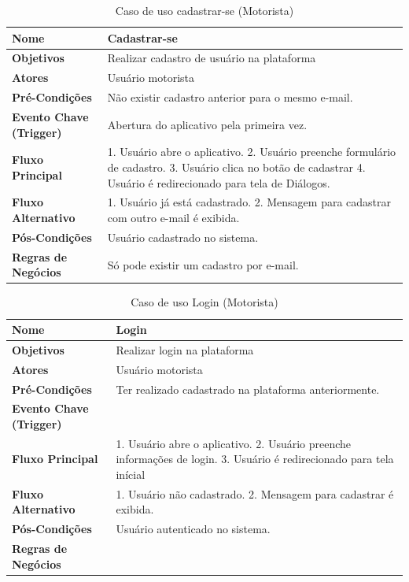 \begin{table}[H]
\begin{center}
\caption{Caso de uso cadastrar-se (Motorista)}
\label{tab:caso-uso-cadastrar}
\begin{tabular}{|p{4cm}|p{9cm}|}
\hline
\textbf{Nome} & Cadastrar-se \\
\hline
\textbf{Objetivos} & Realizar cadastro de usuário na plataforma \\
\hline
\textbf{Atores} & Usuário motorista \\
\hline
\textbf{Pré-Condições} & Não existir cadastro anterior para o mesmo e-mail. \\
\hline
\textbf{Evento Chave (Trigger)} & Abertura do aplicativo pela primeira vez. \\
\hline
\textbf{Fluxo Principal} & 1. Usuário abre o aplicativo. 2. Usuário preenche formulário de cadastro. 3. Usuário clica no botão de cadastrar 4. Usuário é redirecionado para tela de Diálogos. \\
\hline
\textbf{Fluxo Alternativo} & 1. Usuário já está cadastrado. 2. Mensagem para cadastrar com outro e-mail é exibida. \\
\hline
\textbf{Pós-Condições} & Usuário cadastrado no sistema. \\
\hline
\textbf{Regras de Negócios} & Só pode existir um cadastro por e-mail. \\
\hline
\end{tabular}
\end{center}
\end{table}

\begin{table}[H]
\begin{center}
\caption{Caso de uso Login (Motorista)}
\label{tab:caso-uso-login}
\begin{tabular}{|p{4cm}|p{9cm}|}
\hline
\textbf{Nome} & Login \\
\hline
\textbf{Objetivos} & Realizar login na plataforma \\
\hline
\textbf{Atores} & Usuário motorista \\
\hline
\textbf{Pré-Condições} & Ter realizado cadastrado na plataforma anteriormente. \\
\hline
\textbf{Evento Chave (Trigger)} & \\
\hline
\textbf{Fluxo Principal} & 1. Usuário abre o aplicativo. 2. Usuário preenche informações de login. 3. Usuário é redirecionado para tela inícial \\
\hline
\textbf{Fluxo Alternativo} & 1. Usuário não cadastrado. 2. Mensagem para cadastrar é exibida. \\
\hline
\textbf{Pós-Condições} & Usuário autenticado no sistema. \\
\hline
\textbf{Regras de Negócios} & \\
\hline
\end{tabular}
\end{center}
\end{table}

